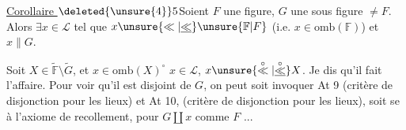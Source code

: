 \noindent\llap{\smash{\rule[-9.2\baselineskip]{0.4pt}{9.8\baselineskip}}\quad}%
\uline{Corollaire $\deleted{\unsure{4}}5$}\quad Soient $F$ une figure, $G$ une
\llap{\smash{\rule[-1.4\baselineskip]{0.4pt}{1.8\baselineskip}}\enspace}sous figure $\neq F$. Alors $\exists x\in\mathcal L$ tel que
$x\unsure{\ll|\underline{\ll}}\unsure{\mathbb F|F}$ (i.e. $x\in\mathrm{omb}(\mathbb F)$) et $x\parallel G$.

Soit $X\in\widetilde{\mathbb F}\setminus\widetilde G$, et $x\in\mathrm{omb}(X)^\circ$ 
 $x\in\mathcal L$, $x\unsure{\overset{\circ}{\ll}|\overset{\circ}{\underline{\ll}}}X$. Je dis qu'il fait l'affaire.
Pour voir qu'il est disjoint de $G$, on peut
soit invoquer At 9 (critère de disjonction pour les
lieux) et At 10, (critère de disjonction pour les lieux),
soit se  à  l'axiome de recollement, pour
 $G\amalg x$ comme  $F$ ...
